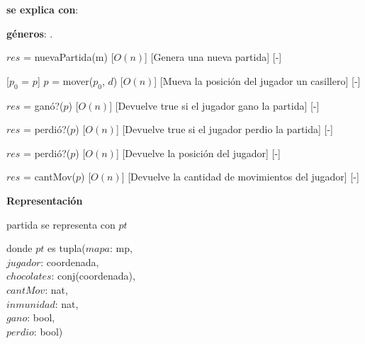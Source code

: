 \documentclass{book}
\begin{document}
    \begin{Interfaz}

        \textbf{se explica con}: 

        \textbf{géneros}: .


            {$res$ = nuevaPartida(m)}%
            [$O(n)$]
            [Genera una nueva partida]
            [-]

            [$p_0$ = $p$]
            {$p$ = mover($p_0$, $d$)}%
            [$O(n)$]
            [Mueva la posición del jugador un casillero]
            [-]

            {$res$ = ganó?($p$)}%
            [$O(n)$]
            [Devuelve true si el jugador gano la partida]
            [-]

            {$res$ = perdió?($p$)}%
            [$O(n)$]
            [Devuelve true si el jugador perdio la partida]
            [-]

            {$res$ = perdió?($p$)}%
            [$O(n)$]
            [Devuelve la posición del jugador]
            [-]

            {$res$ = cantMov($p$)}%
            [$O(n)$]
            [Devuelve la cantidad de movimientos del jugador]
            [-]

    \end{Interfaz}

    \newpage

    \textbf{Representación}

    partida se representa con $pt$

    donde $pt$ es tupla($mapa$: mp, \\
        \text{}\qquad\quad$jugador$: coordenada, \\
        \text{}\qquad\quad$chocolates$: conj(coordenada), \\
        \text{}\qquad\quad$cantMov$: nat, \\
        \text{}\qquad\quad$inmunidad$: nat, \\
        \text{}\qquad\quad$gano$: bool, \\
        \text{}\qquad\quad$perdio$: bool)
\end{document}

